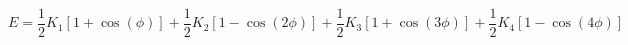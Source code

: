 \documentclass[12pt]{article}
\begin{document}
$$
  E = \frac{1}{2} K_1 [1 + \cos(\phi)] + \frac{1}{2} K_2 [1 - \cos(2 \phi)] +
      \frac{1}{2} K_3 [1 + \cos(3 \phi)] + \frac{1}{2} K_4 [1 - \cos(4 \phi)]
$$
\end{document}
